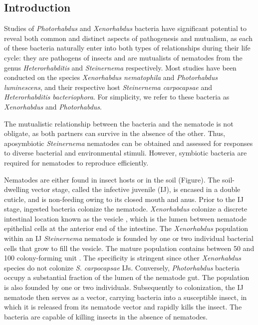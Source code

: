 \documentclass[10pt]{article}
\newcommand{\Scarpo}{\textit{S. carpocapsae} }
\newcommand{\Xenonema}{\textit{Xenorhabdus nematophila} }
\newcommand{\Steincarpo}{\textit{Steinernema carpocapsae} }
\newcommand{\Xeno}{\textit{Xenorhabdus} }
\newcommand{\Stein}{\textit{Steinernema} }
\newcommand{\Photo}{\textit{Photorhabdus} }
\newcommand{\Hetero}{\textit{Heterorhabditis} }
\begin{document}
\begin{multicols}{2}
\section*{Introduction}

Studies of \Photo and \textit{Xenorhabdus} bacteria have significant potential to reveal both common and distinct aspects of pathogenesis and mutualism, as each of these bacteria naturally enter into both types of relationships during their life cycle: they are pathogens of insects and are mutualists of nematodes from the genus \Hetero and \Stein respectively.
Most studies have been conducted on the species \Xenonema and \textit{Photorhabdus luminescens}, and their respective host \Steincarpo and \textit{Heterorhabditis bacteriophora}. For simplicity, we refer to these bacteria as \Xeno and \textit{Photorhabdus}.

The mutualistic relationship between the bacteria and the nematode is not obligate, as both partners can survive in the absence of the other.
Thus, aposymbiotic \Stein nematodes can be obtained and assessed for responses to diverse bacterial and environmental stimuli.
However, symbiotic bacteria are required for nematodes to reproduce efficiently.

Nematodes are either found in insect hosts or in the soil (Figure).
The soil-dwelling vector stage, called the infective juvenile (IJ), is encased in a double cuticle, and is non-feeding owing to its closed mouth and anus.
Prior to the IJ stage, ingested bacteria colonize the nematode.
\Xeno colonize a discrete intestinal location known as the vesicle , which is the lumen between nematode epithelial cells at the anterior end of the intestine.
The \Xeno population within an IJ \Stein nematode is founded by one or two individual bacterial cells that grow to fill the vesicle.
The mature population contains between 50 and 100 colony-forming unit .
The specificity is stringent since other \Xeno species do not colonize \Scarpo IJs.
Conversely, \Photo bacteria occupy a substantial fraction of the lumen of the nematode gut.
The population is also founded by one or two individuals.
Subsequently to colonization, the IJ nematode then serves as a vector, carrying bacteria into a susceptible insect, in which it is released from its nematode vector and rapidly kills the insect.
The bacteria are capable of killing insects in the absence of nematodes.


\end{multicols}
\end{document}
